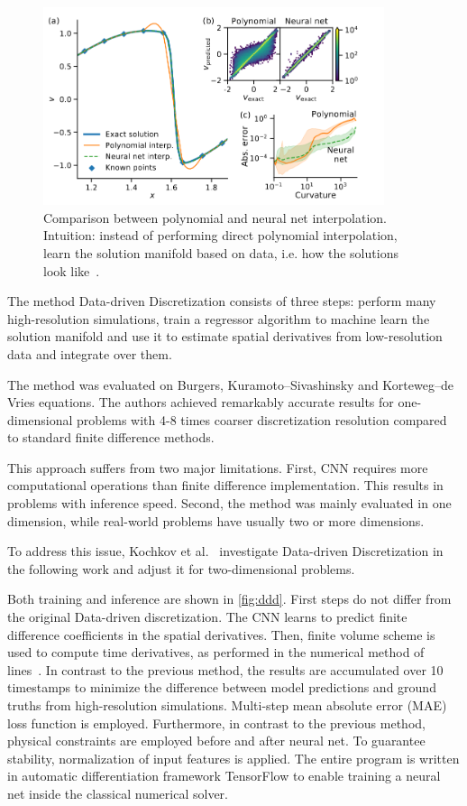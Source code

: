 \begin{figure}
	\centering
	\includegraphics[width=10cm]{figures/ddinterpolation.png}
	\caption{Comparison between polynomial and neural net interpolation. Intuition: instead of performing direct polynomial interpolation, learn the solution manifold based on data, i.e. how the solutions look like~\cite{Brenner19}.}
	\label{fig:ddi}
\end{figure}  

The method Data-driven Discretization consists of three steps: perform many high-resolution simulations, train a regressor algorithm to machine learn the solution manifold and use it to estimate spatial derivatives from low-resolution data and integrate over them.

The method was evaluated on Burgers, Kuramoto--Sivashinsky and Korteweg--de Vries equations. The authors achieved remarkably accurate results for one-dimensional problems with 4-8 times coarser discretization resolution compared to standard finite difference methods.

This approach suffers from two major limitations. First, CNN requires more computational operations than finite difference implementation. This results in problems with inference speed. Second, the method was mainly evaluated in one dimension, while real-world problems have usually two or more dimensions.

To address this issue, Kochkov et al.~\cite{Brenner20} investigate Data-driven Discretization in the following work and adjust it for two-dimensional problems. 

Both training and inference are shown in \cref{fig:ddd}. First steps do not differ from the original Data-driven discretization. The CNN learns to predict finite difference coefficients in the spatial derivatives. Then, finite volume scheme is used to compute time derivatives, as performed in the numerical method of lines~\cite{schiesser91}. In contrast to the previous method, the results are accumulated over 10 timestamps to minimize the difference between model predictions and ground truths from high-resolution simulations. Multi-step mean absolute error (MAE) loss function is employed. Furthermore, in contrast to the previous method, physical constraints are employed before and after neural net. To guarantee stability, normalization of input features is applied. The entire program is written in automatic differentiation framework TensorFlow to enable training a neural net inside the classical numerical solver.


